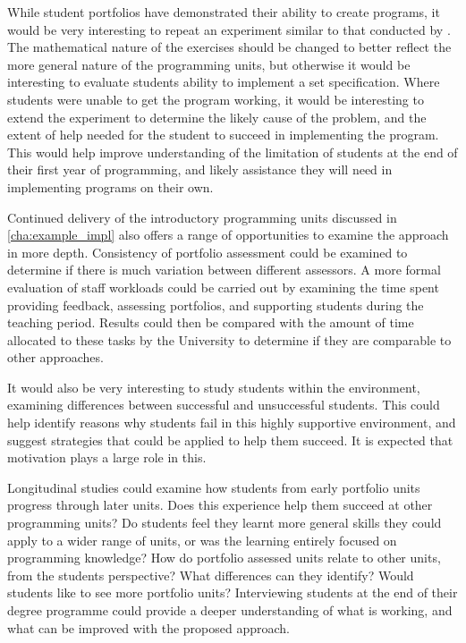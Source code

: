 While student portfolios have demonstrated their ability to create programs, it would be very interesting to repeat an experiment similar to that conducted by \citet{McCracken:2001}. The mathematical nature of the exercises should be changed to better reflect the more general nature of the programming units, but otherwise it would be interesting to evaluate students ability to implement a set specification. Where students were unable to get the program working, it would be interesting to extend the experiment to determine the likely cause of the problem, and the extent of help needed for the student to succeed in implementing the program. This would help improve understanding of the limitation of students at the end of their first year of programming, and likely assistance they will need in implementing programs on their own. 

Continued delivery of the introductory programming units discussed in \cref{cha:example_impl} also offers a range of opportunities to examine the approach in more depth. Consistency of portfolio assessment could be examined to determine if there is much variation between different assessors. A more formal evaluation of staff workloads could be carried out by examining the time spent providing feedback, assessing portfolios, and supporting students during the teaching period. Results could then be compared with the amount of time allocated to these tasks by the University to determine if they are comparable to other approaches.

It would also be very interesting to study students within the environment, examining differences between successful and unsuccessful students. This could help identify reasons why students fail in this highly supportive environment, and suggest strategies that could be applied to help them succeed. It is expected that motivation plays a large role in this.

Longitudinal studies could examine how students from early portfolio units progress through later units. Does this experience help them succeed at other programming units? Do students feel they learnt more general skills they could apply to a wider range of units, or was the learning entirely focused on programming knowledge? How do portfolio assessed units relate to other units, from the students perspective? What differences can they identify? Would students like to see more portfolio units? Interviewing students at the end of their degree programme could provide a deeper understanding of what is working, and what can be improved with the proposed approach.

